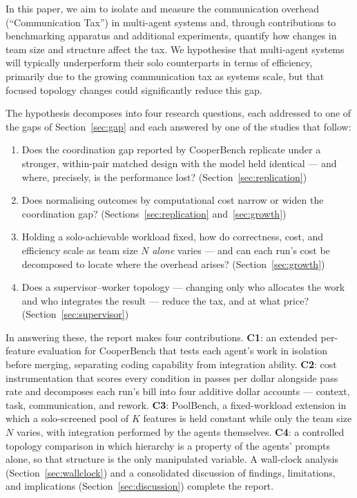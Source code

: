 \documentclass[11pt,a4paper]{article}
\begin{document}
In this paper, we aim to isolate and measure the communication overhead (``Communication Tax'') in multi-agent systems and, through contributions to benchmarking apparatus and additional experiments, quantify how changes in team size and structure affect the tax. We hypothesise that multi-agent systems will typically underperform their solo counterparts in terms of efficiency, primarily due to the growing communication tax as systems scale, but that focused topology changes could significantly reduce this gap.

The hypothesis decomposes into four research questions, each addressed to one of the gaps of Section~\ref{sec:gap} and each answered by one of the studies that follow:

\begin{enumerate}[label=\textbf{RQ\arabic*.}, leftmargin=3.4em]
    \item Does the coordination gap reported by CooperBench replicate under a stronger, within-pair matched design with the model held identical --- and where, precisely, is the performance lost? (Section~\ref{sec:replication})
    \item Does normalising outcomes by computational cost narrow or widen the coordination gap? (Sections~\ref{sec:replication} and~\ref{sec:growth})
    \item Holding a solo-achievable workload fixed, how do correctness, cost, and efficiency scale as team size $N$ \emph{alone} varies --- and can each run's cost be decomposed to locate where the overhead arises? (Section~\ref{sec:growth})
    \item Does a supervisor--worker topology --- changing only who allocates the work and who integrates the result --- reduce the tax, and at what price? (Section~\ref{sec:supervisor})
\end{enumerate}

In answering these, the report makes four contributions. \textbf{C1}: an extended per-feature evaluation for CooperBench that tests each agent's work in isolation before merging, separating coding capability from integration ability. \textbf{C2}: cost instrumentation that scores every condition in passes per dollar alongside pass rate and decomposes each run's bill into four additive dollar accounts --- context, task, communication, and rework. \textbf{C3}: PoolBench, a fixed-workload extension in which a solo-screened pool of $K$ features is held constant while only the team size $N$ varies, with integration performed by the agents themselves. \textbf{C4}: a controlled topology comparison in which hierarchy is a property of the agents' prompts alone, so that structure is the only manipulated variable. A wall-clock analysis (Section~\ref{sec:wallclock}) and a consolidated discussion of findings, limitations, and implications (Section~\ref{sec:discussion}) complete the report.
\end{document}
